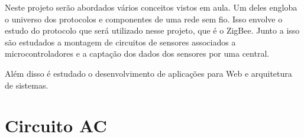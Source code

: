 \label{Cap:conceitos}

Neste projeto serão abordados vários conceitos vistos em aula. Um deles engloba o universo dos protocolos e componentes de uma rede sem fio. Isso envolve o estudo do protocolo que será utilizado nesse projeto, que é o ZigBee. Junto a isso são estudados a montagem de circuitos de sensores associados a microcontroladores e a captação dos dados dos sensores por uma central.

Além disso é estudado o desenvolvimento de aplicações para Web e arquitetura de sistemas.

\section{Circuito AC}
\label{Sec:ac}

